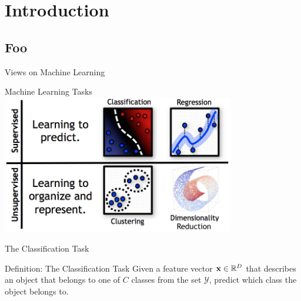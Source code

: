 \documentclass[serif,xcolor=pdftex,dvipsnames,table,hyperref={bookmarks=false,breaklinks}]{beamer}
\begin{document}
\maketitlepage

\section{Introduction}
\subsection{Foo}

\begin{frame}[t]{Views on Machine Learning}


\end{frame}

\begin{frame}[t]{Machine Learning Tasks}
 \centering
 \includegraphics[width=4in]{../Figures/learning_problems.png}
\end{frame}

\begin{frame}[t]{The Classification Task}

\begin{block}{Definition: The Classification Task}
Given a feature vector ${\mathbf{x}}\in\mathbb{R}^D$ that describes an object that 
belongs to one of $C$ classes from the set $\mathcal{Y}$, predict which class 
the object belongs to.
\end{block}

\end{frame}
\end{document}
